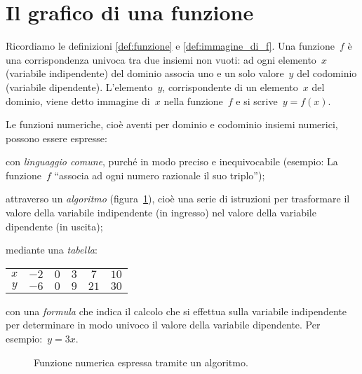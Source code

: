 \ovalbox{\risolvii \ref{ese:D.32}, \ref{ese:D.33}, \ref{ese:D.34}, \ref{ese:D.35}, \ref{ese:D.36}}

\pagebreak

\section{Il grafico di una funzione}

Ricordiamo le definizioni \ref{def:funzione} e \ref{def:immagine_di_f}. Una funzione~$f$ è una corrispondenza univoca tra due insiemi non vuoti: ad ogni elemento~$x$ (variabile indipendente) del dominio associa uno e un solo valore~$y$ del codominio (variabile dipendente).
L'elemento~$y$, corrispondente di un elemento~$x$ del dominio, viene detto immagine di~$x$ nella funzione~$f$ e si scrive~$y=f(x)$.

Le funzioni numeriche, cioè aventi per dominio e codominio insiemi numerici, possono essere espresse:
\begin{itemize*}
\item con \emph{linguaggio comune}, purché in modo preciso e inequivocabile (esempio: La funzione~$f$
 ``associa ad ogni numero razionale il suo triplo'');
\item attraverso un \emph{algoritmo} (figura~\ref{fig:D.19}), cioè una serie di istruzioni per trasformare il valore della variabile indipendente
 (in ingresso) nel valore della variabile dipendente (in uscita);
\item mediante una \emph{tabella}:
 \begin{center}
\begin{tabular}{cccccc}
 \toprule
 $x$ & $-2$ & $0$ & $3$ & $7$ & $10$ \\
 $y$ & $-6$ & $0$ & $9$ & $21$ & $30$\\
 \bottomrule
 \end{tabular}
 \end{center}
\item con una \emph{formula} che indica il calcolo che si effettua sulla variabile indipendente per determinare in modo univoco
il valore della variabile dipendente. Per esempio:~$y=3x$.
\end{itemize*}

\begin{figure}[hbt]
\centering
\caption{Funzione numerica espressa tramite un algoritmo.}\label{fig:D.19}
\end{figure}

